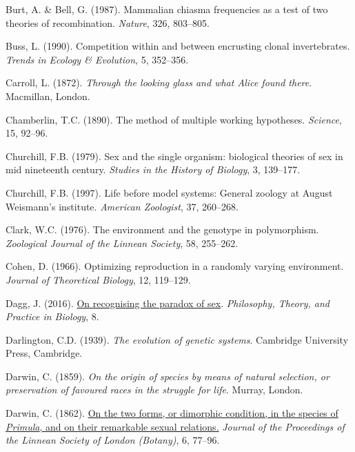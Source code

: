 \documentclass[
  letterpaper,
]{book}
\newlength{\cslhangindent}
\newenvironment{CSLReferences}[2] %
 {\begin{list}{}{%
  \setlength{\itemindent}{0pt}
  \setlength{\leftmargin}{0pt}
  \setlength{\parsep}{0pt}
  \ifodd #1
   \setlength{\leftmargin}{\cslhangindent}
   \setlength{\itemindent}{-1\cslhangindent}
  \fi
  \setlength{\itemsep}{#2\baselineskip}}}
 {\end{list}}
\begin{document}
\begin{CSLReferences}{1}{0}
Burt, A. \& Bell, G. (1987). Mammalian chiasma frequencies as a test of
two theories of recombination. \emph{Nature}, 326, 803--805.

Buss, L. (1990). Competition within and between encrusting clonal
invertebrates. \emph{Trends in Ecology \& Evolution}, 5, 352--356.

Carroll, L. (1872). \emph{Through the looking glass and what {Alice}
found there}. Macmillan, London.

Chamberlin, T.C. (1890). The method of multiple working hypotheses.
\emph{Science}, 15, 92--96.

Churchill, F.B. (1979). Sex and the single organism: {b}iological
theories of sex in mid nineteenth century. \emph{Studies in the History
of Biology}, 3, 139--177.

Churchill, F.B. (1997). Life before model systems: General zoology at
{August Weismann's} institute. \emph{American Zoologist}, 37, 260--268.

Clark, W.C. (1976). The environment and the genotype in polymorphism.
\emph{Zoological Journal of the Linnean Society}, 58, 255--262.

Cohen, D. (1966). Optimizing reproduction in a randomly varying
environment. \emph{Journal of Theoretical Biology}, 12, 119--129.

Dagg, J. (2016). \href{https://doi.org/10.3998/ptb.6959004.0008.003}{On
recognising the paradox of sex}. \emph{Philosophy, Theory, and Practice
in Biology}, 8.

Darlington, C.D. (1939). \emph{The evolution of genetic systems}.
Cambridge University Press, Cambridge.

Darwin, C. (1859). \emph{On the origin of species by means of natural
selection, or preservation of favoured races in the struggle for life}.
Murray, London.

Darwin, C. (1862).
\href{https://doi.org/10.1111/j.1095-8312.1862.tb01218.x}{On the two
forms, or dimorphic condition, in the species of \emph{{P}rimula}, and
on their remarkable sexual relations.} \emph{Journal of the Proceedings
of the Linnean Society of London (Botany)}, 6, 77--96.


\end{CSLReferences}
\end{document}
